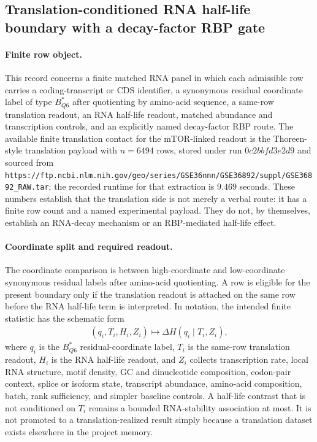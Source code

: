 \subsection{Translation-conditioned RNA half-life boundary with a decay-factor RBP gate}\label{sec:h3-cross-layer-relation-mtor-translation-topscore-mtor-translation-thoreen2012}

\paragraph{Finite row object.}
This record concerns a finite matched RNA panel in which each admissible row carries a coding-transcript or CDS identifier, a synonymous residual coordinate label of type $B^{*}_{Q6}$ after quotienting by amino-acid sequence, a same-row translation readout, an RNA half-life readout, matched abundance and transcription controls, and an explicitly named decay-factor RBP route.  The available finite translation contact for the mTOR-linked readout is the Thoreen-style translation payload with $n=6494$ rows, stored under run $0c2bbfd3e2d9$ and sourced from \texttt{https://ftp.ncbi.nlm.nih.gov/geo/series/GSE36nnn/GSE36892/suppl/GSE36892\_RAW.tar}; the recorded runtime for that extraction is $9.469$ seconds.  These numbers establish that the translation side is not merely a verbal route: it has a finite row count and a named experimental payload.  They do not, by themselves, establish an RNA-decay mechanism or an RBP-mediated half-life effect.

\paragraph{Coordinate split and required readout.}
The coordinate comparison is between high-coordinate and low-coordinate synonymous residual labels after amino-acid quotienting.  A row is eligible for the present boundary only if the translation readout is attached on the same row before the RNA half-life term is interpreted.  In notation, the intended finite statistic has the schematic form
$$
\begin{aligned}
(q_i,T_i,H_i,Z_i) \longmapsto \Delta H(q_i \mid T_i,Z_i),
\end{aligned}
$$
where $q_i$ is the $B^{*}_{Q6}$ residual-coordinate label, $T_i$ is the same-row translation readout, $H_i$ is the RNA half-life readout, and $Z_i$ collects transcription rate, local RNA structure, motif density, GC and dinucleotide composition, codon-pair context, splice or isoform state, transcript abundance, amino-acid composition, batch, rank sufficiency, and simpler baseline controls.  A half-life contrast that is not conditioned on $T_i$ remains a bounded RNA-stability association at most.  It is not promoted to a translation-realized result simply because a translation dataset exists elsewhere in the project memory.

